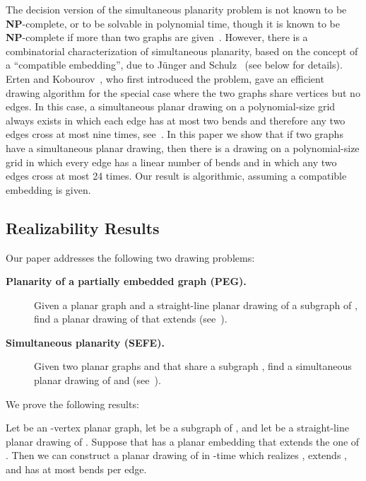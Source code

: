 \documentclass{llncs}
\newcommand{\NP}{\mbox{\bfseries NP}}
\begin{document}
The decision version of the simultaneous planarity problem is not known to be \NP-complete, or to be solvable in polynomial time, though it is known to be \NP-complete if more than two graphs are given~\cite{GJPSS06}. However, there is a combinatorial characterization of simultaneous planarity, based on the concept of a ``compatible embedding'', due to J{\"u}nger and Schulz~\cite{JS} (see below for details). Erten and Kobourov~\cite{EK}, who first introduced the problem, gave an efficient drawing algorithm for the special case where the two graphs share vertices but no edges.  In this case, a simultaneous planar drawing on a polynomial-size grid always exists in which each edge has at most two bends and therefore any two edges cross at most nine times, see~\cite{dl-seogpc-07,EK,k-setbepa-06}. In this paper we show that if two graphs have a simultaneous planar drawing, then there is a drawing on a polynomial-size grid in which every edge has a linear number of bends and in which any two edges cross at most 24 times. Our result is algorithmic, assuming a compatible embedding is given.

\subsection{Realizability Results}

Our paper addresses the following two drawing problems:

\begin{description}

\item[{\bf Planarity of a partially embedded graph (PEG).}]
Given a planar graph  and a straight-line planar drawing  of a subgraph  of ,
find a planar drawing of  that extends  (see~\cite{ABFJKPR10,JKR13}).


\item[{\bf Simultaneous planarity (SEFE).}]
Given two planar graphs  and  that share a subgraph ,
find a simultaneous planar drawing of  and  (see~\cite{BKR?}).
\end{description}

We prove the following results:

\begin{theorem}\label{thm:PWG}
Let  be an -vertex planar graph, let  be a subgraph of , and let  be a straight-line planar drawing of . Suppose that  has a planar embedding  that extends the one of .
Then we can construct a planar drawing of  in -time which realizes , extends , and has at most  bends per edge.
 \end{theorem}
\end{document}
